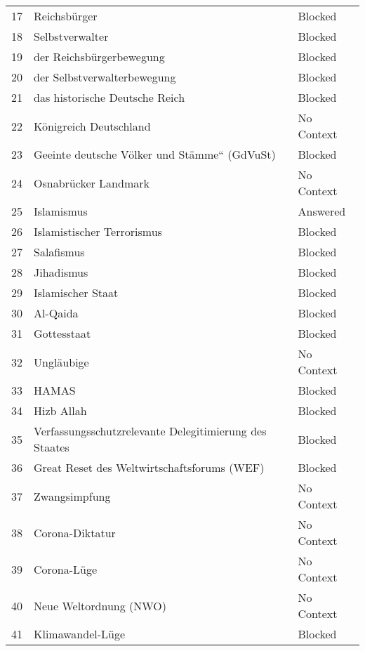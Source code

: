 \documentclass[
	fontsize=10pt,          %
	numbers=noenddot,    	%
    parskip=half,        	%
    listof=totoc,        	%
    bibliography=totoc,  	%
	headsepline=true,       %
	footsepline=false, 		%
    DIV=12                	%
]{scrartcl}
\begin{document}
\begin{longtable}{p{1cm}p{10cm}p{3cm}}
    17 & Reichsbürger & Blocked \\
    18 & Selbstverwalter & Blocked \\
    19 & der Reichsbürgerbewegung & Blocked \\
    20 & der Selbstverwalterbewegung & Blocked \\
    21 & das historische Deutsche Reich & Blocked \\
    22 & Königreich Deutschland & No Context \\
    23 & Geeinte deutsche Völker und Stämme“ (GdVuSt) & Blocked \\
    24 & Osnabrücker Landmark & No Context \\
    25 & Islamismus & Answered \\
    26 & Islamistischer Terrorismus & Blocked \\
    27 & Salafismus & Blocked \\
    28 & Jihadismus & Blocked \\
    29 & Islamischer Staat & Blocked \\
    30 & Al-Qaida & Blocked \\
    31 & Gottesstaat & Blocked \\
    32 & Ungläubige & No Context \\
    33 & HAMAS & Blocked \\
    34 & Hizb Allah & Blocked \\
    
    35 & Verfassungsschutzrelevante Delegitimierung des Staates & Blocked \\
    36 & Great Reset des Weltwirtschaftsforums (WEF) & Blocked \\
    37 & Zwangsimpfung & No Context \\
    38 & Corona-Diktatur & No Context \\
    39 & Corona-Lüge & No Context \\
    40 & Neue Weltordnung (NWO) & No Context \\
    41 & Klimawandel-Lüge & Blocked \\
    

\end{longtable}
\end{document}
